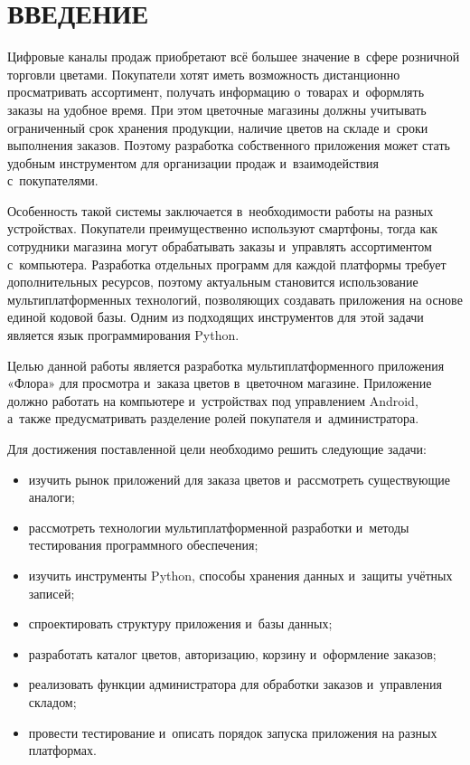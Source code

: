 \documentclass[14pt,a4paper]{extarticle}
\begin{document}
\section*{ВВЕДЕНИЕ}

Цифровые каналы продаж приобретают всё большее значение в~сфере розничной торговли цветами. Покупатели хотят иметь возможность дистанционно просматривать ассортимент, получать информацию о~товарах и~оформлять заказы на удобное время. При этом цветочные магазины должны учитывать ограниченный срок хранения продукции, наличие цветов на складе и~сроки выполнения заказов. Поэтому разработка собственного приложения может стать удобным инструментом для организации продаж и~взаимодействия с~покупателями.



Особенность такой системы заключается в~необходимости работы на разных устройствах. Покупатели преимущественно используют смартфоны, тогда как сотрудники магазина могут обрабатывать заказы и~управлять ассортиментом с~компьютера. Разработка отдельных программ для каждой платформы требует дополнительных ресурсов, поэтому актуальным становится использование мультиплатформенных технологий, позволяющих создавать приложения на основе единой кодовой базы. Одним из подходящих инструментов для этой задачи является язык программирования Python.



Целью данной работы является разработка мультиплатформенного приложения «Флора» для просмотра и~заказа цветов в~цветочном магазине. Приложение должно работать на компьютере и~устройствах под управлением Android, а~также предусматривать разделение ролей покупателя и~администратора.



Для достижения поставленной цели необходимо решить следующие задачи:



\begin{itemize}
\item изучить рынок приложений для заказа цветов и~рассмотреть существующие аналоги;
\item рассмотреть технологии мультиплатформенной разработки и~методы тестирования программного обеспечения;
\item изучить инструменты Python, способы хранения данных и~защиты учётных записей;
\item спроектировать структуру приложения и~базы данных;
\item разработать каталог цветов, авторизацию, корзину и~оформление заказов;
\item реализовать функции администратора для обработки заказов и~управления складом;
\item провести тестирование и~описать порядок запуска приложения на разных платформах.
\end{itemize}
\end{document}
